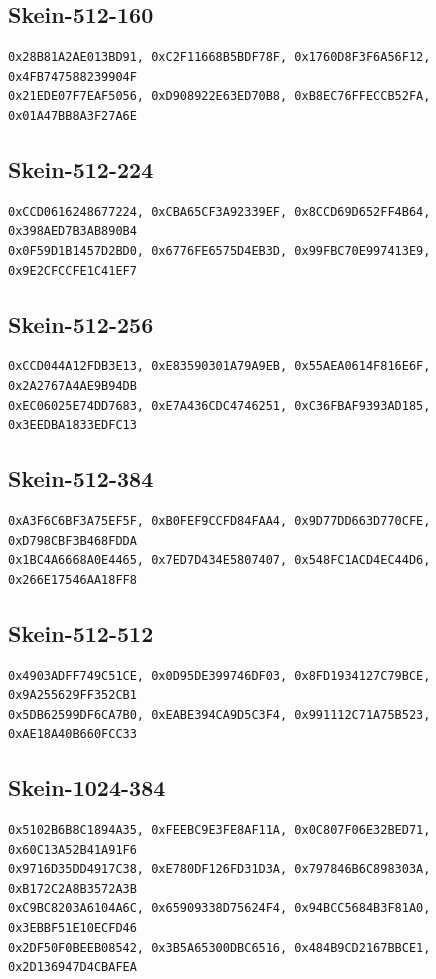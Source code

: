 \documentclass[11pt,twoside]{article}
\begin{document}
\subsection{Skein-512-160}
\begin{verbatim}
0x28B81A2AE013BD91, 0xC2F11668B5BDF78F, 0x1760D8F3F6A56F12, 0x4FB747588239904F
0x21EDE07F7EAF5056, 0xD908922E63ED70B8, 0xB8EC76FFECCB52FA, 0x01A47BB8A3F27A6E
\end{verbatim}

\subsection{Skein-512-224}
\begin{verbatim}
0xCCD0616248677224, 0xCBA65CF3A92339EF, 0x8CCD69D652FF4B64, 0x398AED7B3AB890B4
0x0F59D1B1457D2BD0, 0x6776FE6575D4EB3D, 0x99FBC70E997413E9, 0x9E2CFCCFE1C41EF7
\end{verbatim}

\subsection{Skein-512-256}
\begin{verbatim}
0xCCD044A12FDB3E13, 0xE83590301A79A9EB, 0x55AEA0614F816E6F, 0x2A2767A4AE9B94DB
0xEC06025E74DD7683, 0xE7A436CDC4746251, 0xC36FBAF9393AD185, 0x3EEDBA1833EDFC13
\end{verbatim}

\subsection{Skein-512-384}
\begin{verbatim}
0xA3F6C6BF3A75EF5F, 0xB0FEF9CCFD84FAA4, 0x9D77DD663D770CFE, 0xD798CBF3B468FDDA
0x1BC4A6668A0E4465, 0x7ED7D434E5807407, 0x548FC1ACD4EC44D6, 0x266E17546AA18FF8
\end{verbatim}

\subsection{Skein-512-512}
\begin{verbatim}
0x4903ADFF749C51CE, 0x0D95DE399746DF03, 0x8FD1934127C79BCE, 0x9A255629FF352CB1
0x5DB62599DF6CA7B0, 0xEABE394CA9D5C3F4, 0x991112C71A75B523, 0xAE18A40B660FCC33
\end{verbatim}

\subsection{Skein-1024-384}
\begin{verbatim}
0x5102B6B8C1894A35, 0xFEEBC9E3FE8AF11A, 0x0C807F06E32BED71, 0x60C13A52B41A91F6
0x9716D35DD4917C38, 0xE780DF126FD31D3A, 0x797846B6C898303A, 0xB172C2A8B3572A3B
0xC9BC8203A6104A6C, 0x65909338D75624F4, 0x94BCC5684B3F81A0, 0x3EBBF51E10ECFD46
0x2DF50F0BEEB08542, 0x3B5A65300DBC6516, 0x484B9CD2167BBCE1, 0x2D136947D4CBAFEA
\end{verbatim}
\end{document}
